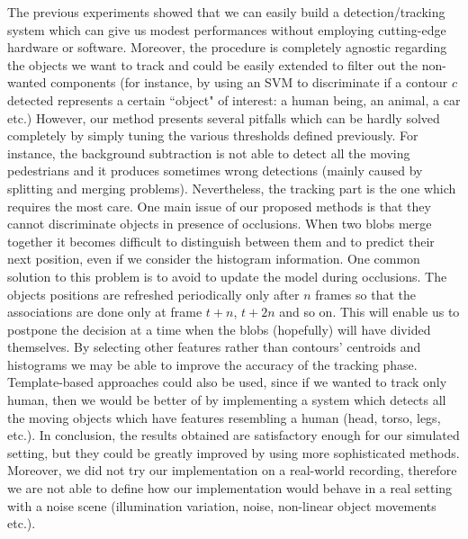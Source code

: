 \documentclass[runningheads]{llncs}
\begin{document}
The previous experiments showed that we can easily build a detection/tracking system which can give us modest performances without employing cutting-edge hardware or software. Moreover, the procedure is completely agnostic regarding the objects we want to track and could be easily extended to filter out the non-wanted components (for instance, by using an SVM to discriminate if a contour $c$ detected represents a certain ``object" of interest: a human being, an animal, a car etc.) However, our method presents several pitfalls which can be hardly solved completely by simply tuning the various thresholds defined previously. For instance, the background subtraction is not able to detect all the moving pedestrians and it produces sometimes wrong detections (mainly caused by splitting and merging problems).
Nevertheless, the tracking part is the one which requires the most care. One main issue of our proposed methods is that they cannot discriminate objects in presence of occlusions. When two blobs merge together it becomes difficult to distinguish between them and to predict their next position, even if we consider the histogram information. One common solution to this problem is to avoid to update the model during occlusions. The objects positions are refreshed periodically only after $n$ frames so that the associations are done only at frame $t+n$, $t+2n$ and so on. This will enable us to postpone the decision at a time when the blobs (hopefully) will have divided themselves.
By selecting other features rather than contours' centroids and histograms we may be able to improve the accuracy of the tracking phase. Template-based approaches could also be used, since if we wanted to track only human, then we would be better of by implementing a system which detects all the moving objects which have features resembling a human (head, torso, legs, etc.).
In conclusion, the results obtained are satisfactory enough for our simulated setting, but they could be greatly improved by using more sophisticated methods. Moreover, we did not try our implementation on a real-world recording, therefore we are not able to define how our implementation would behave in a real setting with a noise scene (illumination variation, noise, non-linear object movements etc.). 

%
%
%
%
%
% 
% 
%


\end{document}
